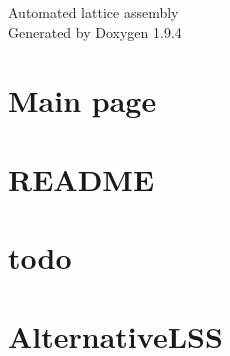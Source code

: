 \documentclass[twoside]{book}
\newcommand{\+}{\discretionary{\mbox{\scriptsize$\hookleftarrow$}}{}{}}
\newcommand{\clearemptydoublepage}{%
    \newpage{\pagestyle{empty}\cleardoublepage}%
  }
\begin{document}
  \raggedbottom
    \hypersetup{pageanchor=false,
                bookmarksnumbered=true,
                pdfencoding=unicode
               }
  \begin{titlepage}
  \vspace*{7cm}
  \begin{center}%
  {\Large Automated lattice assembly}\\
  \vspace*{1cm}
  {\large Generated by Doxygen 1.9.4}\\
  \end{center}
  \end{titlepage}
  \clearemptydoublepage
  \tableofcontents
  \clearemptydoublepage
  \hypersetup{pageanchor=true}
\chapter{Main page}
\label{index}\hypertarget{index}{}
\chapter{README}
\label{md__c___users__guille__lattice_assembly__2___assets__resources__objects__i_l_l_a_v3__l_s_s2_m_c_22ea6a5ed5d5d0bb789ec57ccc075d44}

\chapter{todo}
\label{md__c___users__guille__lattice_assembly__2___assets__resources__objects__i_l_l_a_v3__l_s_s2_m_c_934ee9f82c2a7c2dba3cd82560cad70a}

\chapter{Alternative\+LSS}
\label{md__c___users__guille__lattice_assembly__2___assets__resources__objects__i_l_l_a_v3__l_s_s2_m_c_bae57e565e0f6177706d7160b08ff2a0}

\end{document}
